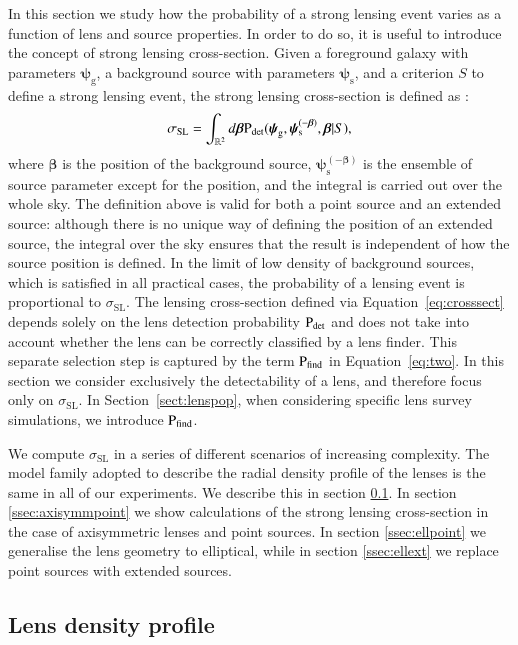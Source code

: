 \documentclass{aa}
\def\psilens{\boldsymbol{\psi}_\mathrm{g}}
\def\psisource{\boldsymbol{\psi}_\mathrm{s}}
\def\psisourcenobeta{\boldsymbol{\psi}_\mathrm{s}^{(-\boldsymbol\beta)}}
\def\pdet{{\rm P}_\mathrm{det}}
\def\pfind{{\rm P}_\mathrm{find}}
\def\crosssect{\sigma_\mathrm{{SL}}}
\def\Sref#1{Section~\ref{#1}\xspace}
\def\Eref#1{Equation~\ref{#1}\xspace}
\begin{document}
In this section we study how the probability of a strong lensing event varies as a function of lens and source properties.
In order to do so, it is useful to introduce the concept of strong lensing cross-section.
Given a foreground galaxy with parameters $\psilens$, a background source with parameters $\psisource$, and a criterion $S$ to define a strong lensing event, the strong lensing cross-section is defined as \citep{Son22}:
\begin{equation}\label{eq:crosssect}
\crosssect = \int_{\mathbb{R}^2} d\boldsymbol\beta \pdet(\psilens,\psisourcenobeta,\boldsymbol\beta|S),
\end{equation}
where $\boldsymbol\beta$ is the position of the background source, $\psisourcenobeta$ is the ensemble of source parameter except for the position, and the integral is carried out over the whole sky.
The definition above is valid for both a point source and an extended source: although there is no unique way of defining the position of an extended source, the integral over the sky ensures that the result is independent of how the source position is defined.
In the limit of low density of background sources, which is satisfied in all practical cases, the probability of a lensing event is proportional to $\crosssect$.
The lensing cross-section defined via \Eref{eq:crosssect} depends solely on the lens detection probability $\pdet$ and does not take into account whether the lens can be correctly classified by a lens finder.
This separate selection step is captured by the term $\pfind$ in \Eref{eq:two}.
In this section we consider exclusively the detectability of a lens, and therefore focus only on $\crosssect$. In \Sref{sect:lenspop}, when considering specific lens survey simulations, we introduce $\pfind$.

We compute $\crosssect$ in a series of different scenarios of increasing complexity.
The model family adopted to describe the radial density profile of the lenses is the same in all of our experiments. We describe this in section \ref{ssec:profile}.
In section \ref{ssec:axisymmpoint} we show calculations of the strong lensing cross-section in the case of axisymmetric lenses and point sources.
In section \ref{ssec:ellpoint} we generalise the lens geometry to elliptical, while in section \ref{ssec:ellext} we replace point sources with extended sources.


\subsection{Lens density profile}\label{ssec:profile}
\end{document}
